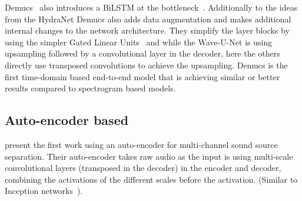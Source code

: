 \cite{narayanaswamyAudio2019}

Demucs~\cite{defossezDemucs2019} also introduces a BiLSTM at the bottleneck~\cite{defossezSING2018}. Additionally to the ideas from the HydraNet Demucs also adds data augmentation and makes additional internal changes to the network architecture. They simplify the layer blocks by using the simpler Gated Linear Units~\cite{dauphinLanguage2017} and while the Wave-U-Net is using upsampling followed by a convolutional layer in the decoder, here the others directly use transposed convolutions to achieve the upsampling. Demucs is the first time-domain based end-to-end model that is achieving similar or better results compared to spectrogram based models.

\subsection{Auto-encoder based}
\textcite{graisRaw2018a} present the first work using an auto-encoder for multi-channel sound source separation. Their auto-encoder takes raw audio as the input is using multi-scale convolutional layers (transposed in the decoder) in the encoder and decoder, combining the activations of the different scales before the activation. (Similar to Inception networks~\cite{szegedyGoing2014}).
